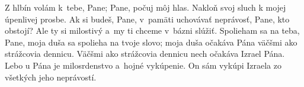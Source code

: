 Z hlbín volám k~tebe, Pane;
Pane, počuj môj hlas.
\versseparator
Nakloň svoj sluch
k mojej úpenlivej prosbe.
\versseparator
Ak si budeš, Pane, v~pamäti uchovávať neprávosť,
Pane, kto obstojí?
\versseparator
Ale ty si milostivý
a~my ti chceme v~bázni slúžiť.
\versseparator
Spolieham sa na teba, Pane,
moja duša sa spolieha na tvoje slovo;
\versseparator
moja duša očakáva Pána
väčšmi ako strážcovia dennicu.
Väčšmi ako strážcovia dennicu
nech očakáva Izrael Pána.
\versseparator
Lebo u Pána je milosrdenstvo
a~hojné vykúpenie.
\versseparator
On sám vykúpi Izraela
zo všetkých jeho neprávostí.